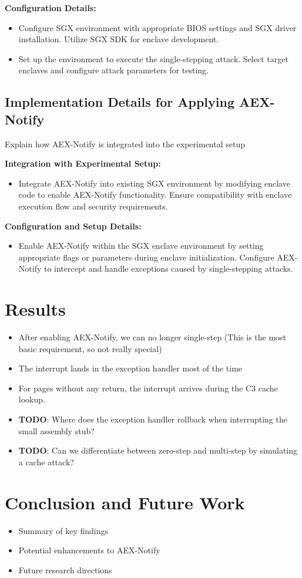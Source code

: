 \documentclass{llncs}
\begin{document}
\textbf{Configuration Details:}
\begin{itemize}
  \item Configure SGX environment with appropriate BIOS settings and SGX driver installation. Utilize SGX SDK for enclave development.
  \item Set up the environment to execute the single-stepping attack. Select target enclaves and configure attack parameters for testing.
\end{itemize}

\subsection{Implementation Details for Applying AEX-Notify}

Explain how AEX-Notify is integrated into the experimental setup

\textbf{Integration with Experimental Setup:}
\begin{itemize}
  \item Integrate AEX-Notify into existing SGX environment by modifying enclave code to enable AEX-Notify functionality. Ensure compatibility with enclave execution flow and security requirements.
\end{itemize}

\textbf{Configuration and Setup Details:}
\begin{itemize}
  \item Enable AEX-Notify within the SGX enclave environment by setting appropriate flags or parameters during enclave initialization. Configure AEX-Notify to intercept and handle exceptions caused by single-stepping attacks.
\end{itemize}

\section{Results}

\begin{itemize}
  \item After enabling AEX-Notify, we can no longer single-step (This is the most basic requirement, so not really special)
  \item The interrupt lands in the exception handler most of the time
  \item For pages without any return, the interrupt arrives during the C3 cache lookup.
  \item \textbf{TODO}: Where does the exception handler rollback when interrupting the small assembly stub?
  \item \textbf{TODO}: Can we differentiate between zero-step and multi-step by simulating a cache attack?
\end{itemize}

\section{Conclusion and Future Work}
\begin{itemize}
    \item Summary of key findings
    \item Potential enhancements to AEX-Notify
    \item Future research directions
\end{itemize}


%

\end{document}
